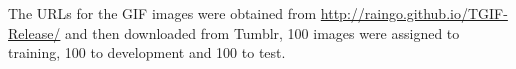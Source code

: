 
The URLs for the GIF images were obtained from \url{http://raingo.github.io/TGIF-Release/}   and then downloaded from Tumblr, 100 images were assigned to training, 100 to development and 100 to test.


